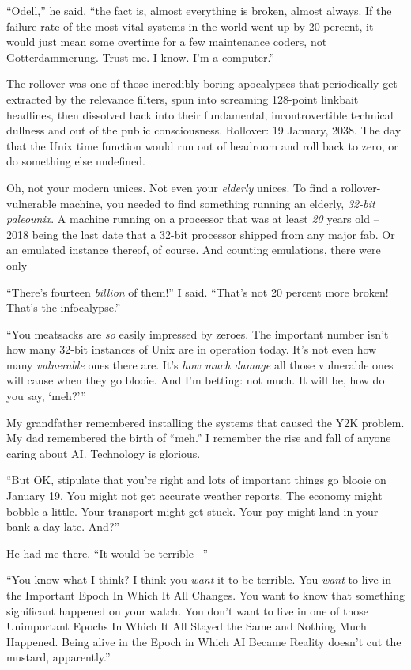“Odell,” he said, “the fact is, almost everything is broken, 
almost always. If the failure rate of the most vital systems in the 
world went up by 20 percent, it would just mean some overtime for a few 
maintenance coders, not Gotterdammerung. Trust me. I know. I'm a 
computer.”

The rollover was one of those incredibly boring apocalypses that 
periodically get extracted by the relevance filters, spun into 
screaming 128-point linkbait headlines, then dissolved back into their 
fundamental, incontrovertible technical dullness and out of the public 
consciousness. Rollover: 19 January, 2038. The day that the Unix time 
function would run out of headroom and roll back to zero, or do 
something else undefined.

Oh, not your modern unices. Not even your \emph{elderly} unices. To 
find a rollover-vulnerable machine, you needed to find something 
running an elderly, \emph{32-bit paleounix}. A machine running on a 
processor that was at least \emph{20} years old -- 2018 being the last 
date that a 32-bit processor shipped from any major fab. Or an emulated 
instance thereof, of course. And counting emulations, there were only --

“There's fourteen \emph{billion} of them!” I said. “That's not 20 
percent more broken! That's the infocalypse.”

“You meatsacks are \emph{so} easily impressed by zeroes. The 
important number isn't how many 32-bit instances of Unix are in 
operation today. It's not even how many \emph{vulnerable} ones there 
are. It's \emph{how much damage} all those vulnerable ones will cause 
when they go blooie. And I'm betting: not much. It will be, how do you 
say, `meh?'”

My grandfather remembered installing the systems that caused the Y2K 
problem. My dad remembered the birth of “meh.” I remember the rise 
and fall of anyone caring about AI. Technology is glorious.

“But OK, stipulate that you're right and lots of important things go 
blooie on January 19. You might not get accurate weather reports. The 
economy might bobble a little. Your transport might get stuck. Your pay 
might land in your bank a day late. And?”

He had me there. “It would be terrible --”

“You know what I think? I think you \emph{want} it to be terrible. 
You \emph{want} to live in the Important Epoch In Which It All Changes. 
You want to know that something significant happened on your watch. You 
don't want to live in one of those Unimportant Epochs In Which It All 
Stayed the Same and Nothing Much Happened. Being alive in the Epoch in 
Which AI Became Reality doesn't cut the mustard, apparently.”


